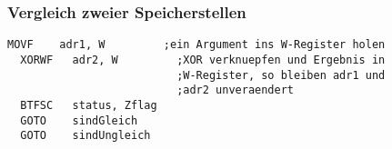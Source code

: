 \subsubsection*{Vergleich zweier Speicherstellen}
\begin{lstlisting}[language=avr]
  MOVF    adr1, W         ;ein Argument ins W-Register holen
  XORWF   adr2, W         ;XOR verknuepfen und Ergebnis in 
                          ;W-Register, so bleiben adr1 und 
                          ;adr2 unveraendert
  BTFSC   status, Zflag
  GOTO    sindGleich
  GOTO    sindUngleich
  \end{lstlisting}